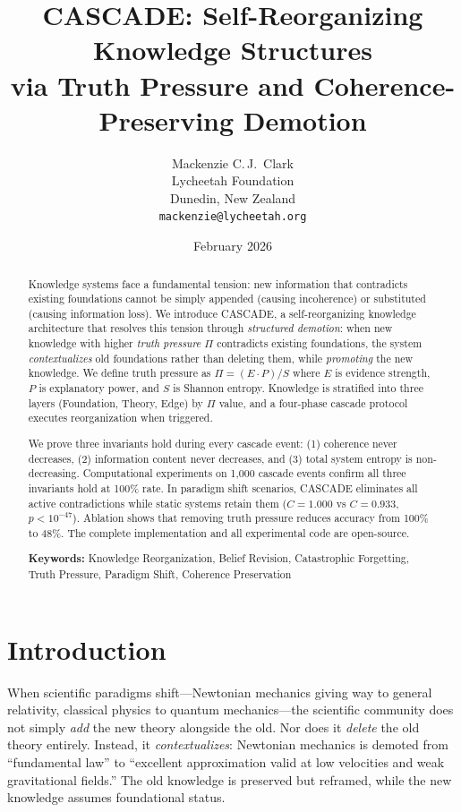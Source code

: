 \documentclass[11pt,a4paper]{article}
\title{%
CASCADE: Self-Reorganizing Knowledge Structures\\
via Truth Pressure and Coherence-Preserving Demotion}
\author{%
Mackenzie C.\,J.~Clark\\
Lycheetah Foundation\\
Dunedin, New Zealand\\
\texttt{mackenzie@lycheetah.org}
}
\date{February 2026}
\theoremstyle{definition}
\newcommand{\tp}{\Pi}
\begin{document}
\maketitle

\begin{abstract}
Knowledge systems face a fundamental tension: new information that contradicts existing foundations cannot be simply appended (causing incoherence) or substituted (causing information loss). We introduce CASCADE, a self-reorganizing knowledge architecture that resolves this tension through \emph{structured demotion}: when new knowledge with higher \emph{truth pressure} $\tp$ contradicts existing foundations, the system \emph{contextualizes} old foundations rather than deleting them, while \emph{promoting} the new knowledge. We define truth pressure as $\tp = (E \cdot P) / S$ where $E$ is evidence strength, $P$ is explanatory power, and $S$ is Shannon entropy. Knowledge is stratified into three layers (Foundation, Theory, Edge) by $\tp$ value, and a four-phase cascade protocol executes reorganization when triggered.

We prove three invariants hold during every cascade event: (1) coherence never decreases, (2) information content never decreases, and (3) total system entropy is non-decreasing. Computational experiments on 1{,}000 cascade events confirm all three invariants hold at 100\% rate. In paradigm shift scenarios, CASCADE eliminates all active contradictions while static systems retain them ($C=1.000$ vs $C=0.933$, $p < 10^{-47}$). Ablation shows that removing truth pressure reduces accuracy from 100\% to 48\%. The complete implementation and all experimental code are open-source.

\medskip
\noindent\textbf{Keywords:} Knowledge Reorganization, Belief Revision, Catastrophic Forgetting, Truth Pressure, Paradigm Shift, Coherence Preservation
\end{abstract}

\section{Introduction}\label{sec:intro}

When scientific paradigms shift---Newtonian mechanics giving way to general relativity, classical physics to quantum mechanics---the scientific community does not simply \emph{add} the new theory alongside the old. Nor does it \emph{delete} the old theory entirely. Instead, it \emph{contextualizes}: Newtonian mechanics is demoted from ``fundamental law'' to ``excellent approximation valid at low velocities and weak gravitational fields.'' The old knowledge is preserved but reframed, while the new knowledge assumes foundational status.
\end{document}
